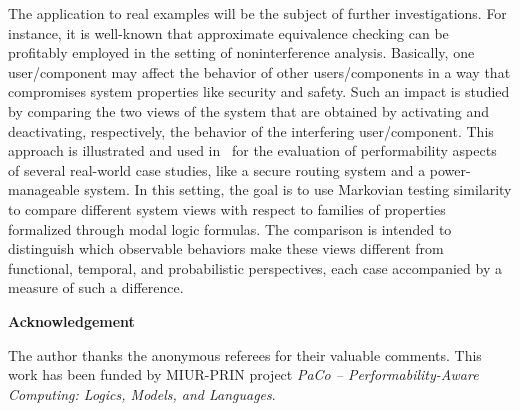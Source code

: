 \documentclass[copyright,creativecommons]{eptcs}
\begin{document}
The application to real examples will be the subject of further investigations. For instance, it is well-known that approximate
equivalence checking can be profitably employed in the setting of noninterference analysis. Basically, one user/component 
may affect the behavior of other users/components in a way that compromises system properties like security and safety. 
Such an impact is studied by comparing the two views of the system that are obtained by activating and deactivating, respectively, 
the behavior of the interfering user/component. This approach is illustrated and used in~\cite{ABC} for the evaluation of 
performability aspects of several real-world case studies, like a secure routing system and a power-manageable system.
In this setting, the goal is to use Markovian testing similarity to compare different system views with respect to families of 
properties formalized through modal logic formulas. The comparison is intended to distinguish which observable 
behaviors make these views different from functional, temporal, and probabilistic perspectives, each case accompanied by a 
measure of such a difference.

\medskip
\noindent
 
        {\bf Acknowledgement}
 
\noindent
The author thanks the anonymous referees for their valuable comments. 
This work has been funded by MIUR-PRIN project \textit{PaCo -- Performability-Aware Computing: Logics, Models, and Languages}.
\end{document}
